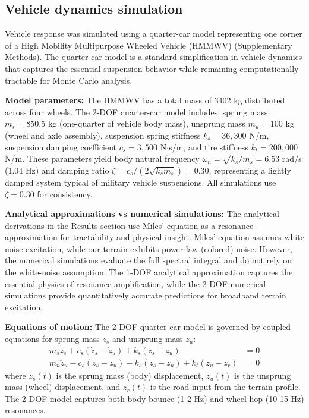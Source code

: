 \documentclass[11pt]{article}
\begin{document}
\subsection*{Vehicle dynamics simulation}

Vehicle response was simulated using a quarter-car model representing one corner of a High Mobility Multipurpose Wheeled Vehicle (HMMWV) (Supplementary Methods). The quarter-car model is a standard simplification in vehicle dynamics that captures the essential suspension behavior while remaining computationally tractable for Monte Carlo analysis.

\textbf{Model parameters:} The HMMWV has a total mass of 3402 kg distributed across four wheels. The 2-DOF quarter-car model includes: sprung mass $m_s = 850.5$ kg (one-quarter of vehicle body mass), unsprung mass $m_u = 100$ kg (wheel and axle assembly), suspension spring stiffness $k_s = 36,300$ N/m, suspension damping coefficient $c_s = 3,500$ N$\cdot$s/m, and tire stiffness $k_t = 200,000$ N/m. These parameters yield body natural frequency $\omega_n = \sqrt{k_s/m_s} = 6.53$ rad/s (1.04 Hz) and damping ratio $\zeta = c_s/(2\sqrt{k_s m_s}) = 0.30$, representing a lightly damped system typical of military vehicle suspensions. All simulations use $\zeta = 0.30$ for consistency.

\textbf{Analytical approximations vs numerical simulations:} The analytical derivations in the Results section use Miles' equation as a resonance approximation for tractability and physical insight. Miles' equation assumes white noise excitation, while our terrain exhibits power-law (colored) noise. However, the numerical simulations evaluate the full spectral integral and do not rely on the white-noise assumption. The 1-DOF analytical approximation captures the essential physics of resonance amplification, while the 2-DOF numerical simulations provide quantitatively accurate predictions for broadband terrain excitation.

\textbf{Equations of motion:} The 2-DOF quarter-car model is governed by coupled equations for sprung mass $z_s$ and unsprung mass $z_u$:
\begin{align}
m_s \ddot{z}_s + c_s (\dot{z}_s - \dot{z}_u) + k_s (z_s - z_u) &= 0 \\
m_u \ddot{z}_u - c_s (\dot{z}_s - \dot{z}_u) - k_s (z_s - z_u) + k_t (z_u - z_r) &= 0
\end{align}
where $z_s(t)$ is the sprung mass (body) displacement, $z_u(t)$ is the unsprung mass (wheel) displacement, and $z_r(t)$ is the road input from the terrain profile. The 2-DOF model captures both body bounce (1-2 Hz) and wheel hop (10-15 Hz) resonances.
\end{document}
